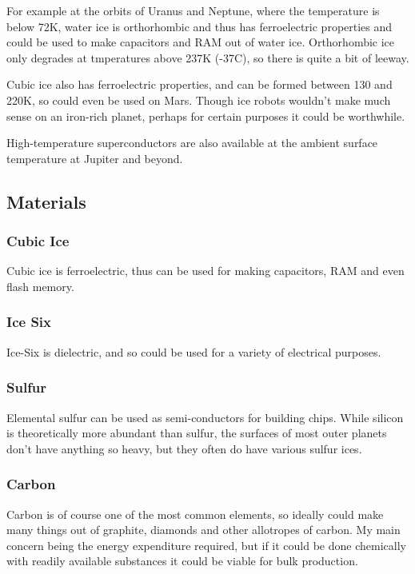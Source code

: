 For example at the orbits of Uranus and Neptune, where the temperature is below
72K, water ice is orthorhombic and thus has ferroelectric properties and could
be used to make capacitors and RAM out of water ice. Orthorhombic ice only
degrades at tmperatures above 237K (-37C), so there is quite a bit of leeway. 

Cubic ice also has ferroelectric properties, and can be formed between 130 and
220K, so could even be used on Mars. Though ice robots wouldn't make much sense
on an iron-rich planet, perhaps for certain purposes it could be worthwhile. 


High-temperature superconductors are also available at the ambient surface 
temperature at Jupiter and beyond.
\subsection{Materials}
\subsubsection{Cubic Ice}
Cubic ice is ferroelectric\cite{Cubic Ice}, thus can be used for making
capacitors, RAM and even flash memory. 

\subsubsection{Ice Six}
Ice-Six is dielectric\cite{iceSix}, and so could be used for a variety of
electrical purposes. 

\subsubsection{Sulfur}

Elemental sulfur can be used as semi-conductors for building chips. 
While silicon is theoretically more abundant than sulfur, the surfaces of most
outer planets don't have anything so heavy, but they often do have various
sulfur ices. 

\subsubsection{Carbon}
Carbon is of course one of the most common elements, so ideally could make many
things out of graphite, diamonds and other allotropes of carbon. 
My main concern being the energy expenditure required, but if it could be done
chemically with readily available substances it could be viable for bulk
production. 

